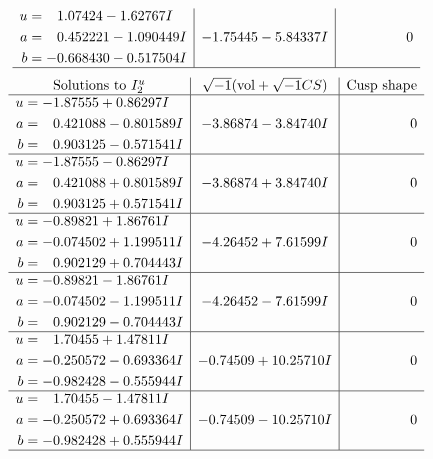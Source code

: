 \documentclass[1p]{elsarticle_modified}
\theoremstyle{definition}
\newcommand{\I}{\sqrt{-1}}
\begin{document}
$$\begin{array}{c|c|c}
\begin{aligned}
u &= \phantom{-}1.07424 - 1.62767 I \\
a &= \phantom{-}0.452221 - 1.090449 I \\
b &= -0.668430 - 0.517504 I\end{aligned}
 & -1.75445 - 5.84337 I & \phantom{-0.000000 } 0\\
 \hline 
 \end{array}$$\newpage$$\begin{array}{c|c|c}  
\text{Solutions to }I^u_{2}& \I (\text{vol} + \sqrt{-1}CS) & \text{Cusp shape}\\
 \hline 
\begin{aligned}
u &= -1.87555 + 0.86297 I \\
a &= \phantom{-}0.421088 - 0.801589 I \\
b &= \phantom{-}0.903125 - 0.571541 I\end{aligned}
 & -3.86874 - 3.84740 I & \phantom{-0.000000 } 0 \\ \hline\begin{aligned}
u &= -1.87555 - 0.86297 I \\
a &= \phantom{-}0.421088 + 0.801589 I \\
b &= \phantom{-}0.903125 + 0.571541 I\end{aligned}
 & -3.86874 + 3.84740 I & \phantom{-0.000000 } 0 \\ \hline\begin{aligned}
u &= -0.89821 + 1.86761 I \\
a &= -0.074502 + 1.199511 I \\
b &= \phantom{-}0.902129 + 0.704443 I\end{aligned}
 & -4.26452 + 7.61599 I & \phantom{-0.000000 } 0 \\ \hline\begin{aligned}
u &= -0.89821 - 1.86761 I \\
a &= -0.074502 - 1.199511 I \\
b &= \phantom{-}0.902129 - 0.704443 I\end{aligned}
 & -4.26452 - 7.61599 I & \phantom{-0.000000 } 0 \\ \hline\begin{aligned}
u &= \phantom{-}1.70455 + 1.47811 I \\
a &= -0.250572 - 0.693364 I \\
b &= -0.982428 - 0.555944 I\end{aligned}
 & -0.74509 + 10.25710 I & \phantom{-0.000000 } 0 \\ \hline\begin{aligned}
u &= \phantom{-}1.70455 - 1.47811 I \\
a &= -0.250572 + 0.693364 I \\
b &= -0.982428 + 0.555944 I\end{aligned}
 & -0.74509 - 10.25710 I & \phantom{-0.000000 } 0\\
 \hline 
 \end{array}$$\newpage\newpage\renewcommand{\arraystretch}{1}
\end{document}
